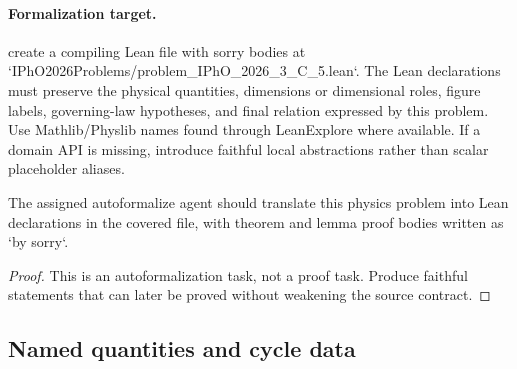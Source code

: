\paragraph{Formalization target.}
create a compiling Lean file with sorry bodies at `IPhO2026Problems/problem\_IPhO\_2026\_3\_C\_5.lean`.
The Lean declarations must preserve the physical quantities, dimensions or dimensional roles, figure labels, governing-law hypotheses, and final relation expressed by this problem.
Use Mathlib/Physlib names found through LeanExplore where available. If a domain API is missing, introduce faithful local abstractions rather than scalar placeholder aliases.

\begin{theorem}
\label{thm:physics:IPhO_2026_3_C_5:target}
The assigned autoformalize agent should translate this physics problem into Lean declarations in the covered file, with theorem and lemma proof bodies written as `by sorry`.
\end{theorem}
\begin{proof}
This is an autoformalization task, not a proof task. Produce faithful statements that can later be proved without weakening the source contract.
\end{proof}

\subsection*{Named quantities and cycle data}

